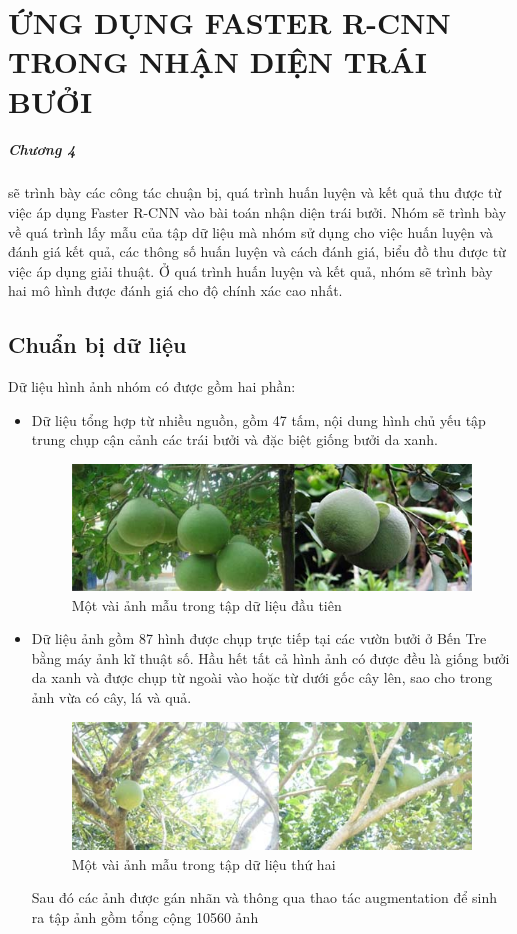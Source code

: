 \chapter{ỨNG DỤNG FASTER R-CNN TRONG NHẬN DIỆN TRÁI BƯỞI}
\label{chap:caseMedical}
\paragraph{Chương 4} sẽ trình bày các công tác chuận bị, quá trình huấn luyện và kết quả thu được từ việc áp dụng Faster R-CNN vào bài toán nhận diện trái bưởi. Nhóm sẽ trình bày về quá trình lấy mẫu của tập dữ liệu mà nhóm sử dụng cho việc huấn luyện và đánh giá kết quả, các thông số huấn luyện và cách đánh giá, biểu đồ thu được từ việc áp dụng giải thuật. Ở quá trình huấn luyện và kết quả, nhóm sẽ trình bày hai mô hình được đánh giá cho độ chính xác cao nhất. \\
\section{Chuẩn bị dữ liệu}
Dữ liệu hình ảnh nhóm có được gồm hai phần:
\begin{itemize}
  \item Dữ liệu tổng hợp từ nhiều nguồn, gồm 47 tấm, nội dung hình chủ yếu tập trung chụp cận cảnh các trái bưởi và đặc biệt giống bưởi da xanh.
  	\begin{center}
    	\begin{figure}[H]
    	\centering
    	\includegraphics[width=0.8\columnwidth]{images/chap3/sample1.jpg}
    	\caption{Một vài ảnh mẫu trong tập dữ liệu đầu tiên}
    	\label{fig:my_label}
    	\end{figure}
	\end{center}
  \item Dữ liệu ảnh gồm 87 hình được chụp trực tiếp tại các vườn bưởi ở Bến Tre bằng máy ảnh kĩ thuật số. Hầu hết tất cả hình ảnh có được đều là giống bưởi da xanh và được chụp từ ngoài vào hoặc từ dưới gốc cây lên, sao cho trong ảnh vừa có cây, lá và quả. 
  	\begin{center}
    	\begin{figure}[H]
    	\centering
    	\includegraphics[width=0.7\columnwidth]{images/chap3/sample2.jpg}
    	\caption{Một vài ảnh mẫu trong tập dữ liệu thứ hai}
    	\label{fig:my_label}
    	\end{figure}
	\end{center}
Sau đó các ảnh được gán nhãn và thông qua thao tác augmentation để sinh ra tập ảnh gồm tổng cộng 10560 ảnh
\end{itemize}
